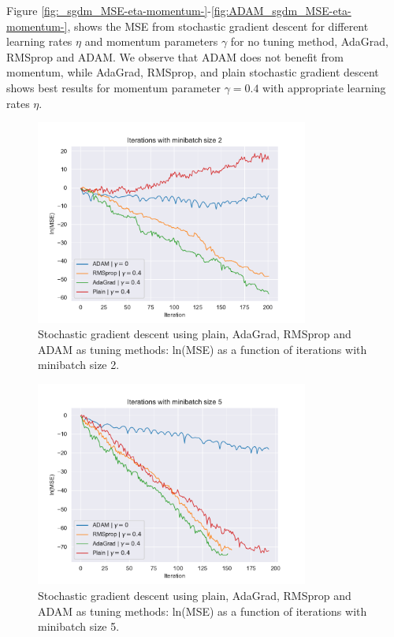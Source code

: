 Figure \ref{fig:_sgdm_MSE-eta-momentum-}-\ref{fig:ADAM_sgdm_MSE-eta-momentum-}, shows the MSE from stochastic gradient descent for different
learning rates $\eta $ and momentum parameters $\gamma $ for no tuning method, AdaGrad, RMSprop and ADAM. We observe that ADAM does not benefit 
from momentum, while AdaGrad, RMSprop, and plain stochastic gradient descent shows best results for momentum parameter $\gamma =0.4$ with appropriate 
learning rates $\eta $.  


\begin{figure}[H]
\centering
\includegraphics[width=0.8\textwidth]{Figures/PartA/minibatch_2_MSE(iter).pdf}
\caption{Stochastic gradient descent using plain, AdaGrad, RMSprop and ADAM as tuning methods: ln(MSE) as a function of iterations with minibatch size 2.}
\label{fig:minibatch_2_MSE-iter}
\end{figure}

\begin{figure}[H]
\centering
\includegraphics[width=0.8\textwidth]{Figures/PartA/minibatch_5_MSE(iter).pdf}
\caption{Stochastic gradient descent using plain, AdaGrad, RMSprop and ADAM as tuning methods: ln(MSE) as a function of iterations with minibatch size 5.}
\label{fig:minibatch_5_MSE-iter}
\end{figure}

